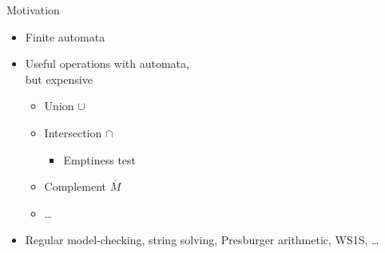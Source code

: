 




\begin{frame}{Motivation}
    \begin{itemize}
        \item Finite automata
        \item Useful operations with automata,\\but expensive
        \begin{itemize}
            \item Union $\cup$
            \item Intersection $\cap$
            \begin{itemize}
                \item Emptiness test
            \end{itemize}
            \item Complement $\overline{M}$
            \item \ldots
        \end{itemize}
        \item Regular model-checking, string solving, Presburger arithmetic, WS1S, \ldots
    \end{itemize}
\end{frame}

